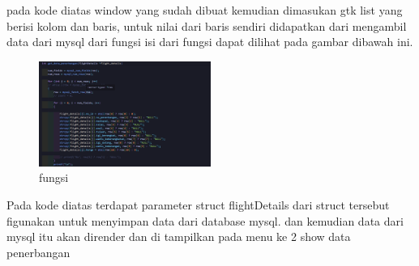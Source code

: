 \documentclass[a4paper,12pt]{article}
\begin{document}
\FloatBarrier
pada kode diatas window yang sudah dibuat kemudian dimasukan gtk list yang berisi kolom dan baris, untuk nilai dari baris sendiri didapatkan dari mengambil data dari mysql dari fungsi \texttt{} 
isi dari fungsi \texttt{} dapat dilihat pada gambar dibawah ini.
\begin{figure}[!htbp]
    \centering
    \includegraphics[width=0.5\textwidth]{./img/dashboard_admin/get_penerbangan.png}
    \caption{fungsi \texttt{}}
\end{figure}
\FloatBarrier
Pada kode diatas terdapat parameter struct flightDetails dari struct tersebut figunakan untuk menyimpan data dari database mysql.
dan kemudian data dari mysql itu akan dirender dan di tampilkan pada menu ke 2 show data penerbangan
\end{document}
